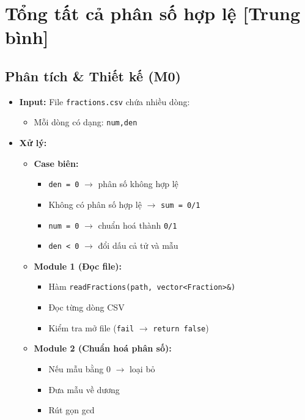 \section{Tổng tất cả phân số hợp lệ [Trung bình]}
\subsection{Phân tích \& Thiết kế (M0)}
\begin{itemize}
    \item \textbf{Input:}
    File \texttt{fractions.csv} chứa nhiều dòng:
    \begin{itemize}
        \item Mỗi dòng có dạng: \texttt{num,den}
    \end{itemize}

    \item \textbf{Xử lý:}
    \begin{itemize}
        \item \textbf{Case biên:}
        \begin{itemize}
            \item \texttt{den = 0} $\rightarrow$ phân số không hợp lệ
            \item Không có phân số hợp lệ $\rightarrow$ \texttt{sum = 0/1}
            \item \texttt{num = 0} $\rightarrow$ chuẩn hoá thành \texttt{0/1}
            \item \texttt{den < 0} $\rightarrow$ đổi dấu cả tử và mẫu
        \end{itemize}

        \item \textbf{Module 1 (Đọc file):}
        \begin{itemize}
            \item Hàm \texttt{readFractions(path, vector<Fraction>\&)}
            \item Đọc từng dòng CSV
            \item Kiểm tra mở file (\texttt{fail} $\rightarrow$ \texttt{return false})
        \end{itemize}

        \item \textbf{Module 2 (Chuẩn hoá phân số):}
        \begin{itemize}
            \item Nếu mẫu bằng 0 $\rightarrow$ loại bỏ
            \item Đưa mẫu về dương
            \item Rút gọn gcd
        \end{itemize}


\end{itemize}
\end{itemize}
